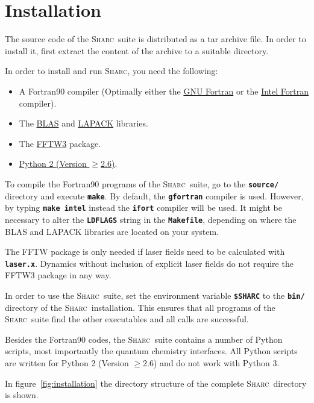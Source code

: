 \documentclass[a4paper,11pt,DIV=15,openany,twoside=false]{scrbook}
\newcommand{\sharc}{\textsc{Sharc}}
\newcommand{\ttt}[1]{\textbf{\texttt{#1}}}
\begin{document}
\section{Installation}

The source code of the  \sharc\ suite is distributed as a tar archive file. In order to install it, first extract the content of the archive to a suitable directory.

In order to install and run \sharc, you need the following:
\begin{itemize}
  \item A Fortran90 compiler (Optimally either the \href{https://gcc.gnu.org/fortran/}{GNU Fortran} or the \href{https://software.intel.com/en-us/fortran-compilers}{Intel Fortran} compiler).
  \item The \href{http://www.netlib.org/blas/}{BLAS} and \href{http://www.netlib.org/lapack/}{LAPACK} libraries.
  \item The \href{http://http://www.fftw.org/}{FFTW3} package.
  \item \href{https://www.python.org/downloads/release/python-278/}{Python 2 (Version $\geq$2.6)}.
\end{itemize}

To compile the Fortran90 programs of the \sharc\ suite, go to the \ttt{source/} directory and execute \ttt{make}. By default, the \ttt{gfortran} compiler is used. However, by typing \ttt{make intel} instead the \ttt{ifort} compiler will be used. 
It might be necessary to alter the \ttt{LDFLAGS} string in the \ttt{Makefile}, depending on where the BLAS and LAPACK libraries are located on your system.

The FFTW package is only needed if laser fields need to be calculated with \ttt{laser.x}. Dynamics without inclusion of explicit laser fields do not require the FFTW3 package in any way.

In order to use the \sharc\ suite, set the environment variable \ttt{\$SHARC} to the \ttt{bin/} directory of the \sharc\ installation. This ensures that all programs of the \sharc\ suite find the other executables and all calls are successful.

Besides the Fortran90 codes, the \sharc\ suite contains a number of Python scripts, most importantly the quantum chemistry interfaces. All Python scripts are written for Python 2 (Version $\geq$2.6) and do not work with Python 3. 

In figure~\ref{fig:installation} the directory structure of the complete \sharc\ directory is shown.
\end{document}

